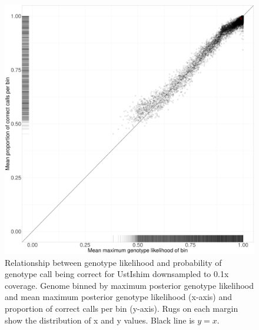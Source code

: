 \begin{figure}[htp]
    \centering
    \includegraphics[width=1.0\textwidth]{../images/appendix/UstIshim_0.1x_bin.pdf}
    \caption{Relationship between genotype likelihood and probability of genotype call being correct for UstIshim downsampled to 0.1x coverage. Genome binned by maximum posterior genotype likelihood and mean maximum posterior genotype likelihood (x-axis) and proportion of correct calls per bin (y-axis). Rugs on each margin show the distribution of x and y values. Black line is $y=x$.}
    \label{fig:UstIshim_0.1x_bin}
\end{figure}

